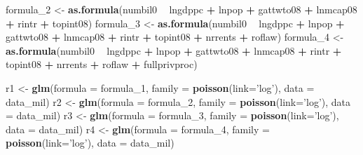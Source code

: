 \documentclass[]{book}
\newenvironment{Shaded}{\begin{snugshade}}{\end{snugshade}}
\newcommand{\KeywordTok}[1]{\textcolor[rgb]{0.13,0.29,0.53}{\textbf{#1}}}
\newcommand{\DataTypeTok}[1]{\textcolor[rgb]{0.13,0.29,0.53}{#1}}
\newcommand{\DecValTok}[1]{\textcolor[rgb]{0.00,0.00,0.81}{#1}}
\newcommand{\StringTok}[1]{\textcolor[rgb]{0.31,0.60,0.02}{#1}}
\newcommand{\OperatorTok}[1]{\textcolor[rgb]{0.81,0.36,0.00}{\textbf{#1}}}
\newcommand{\NormalTok}[1]{#1}
\begin{document}
\begin{Shaded}
\begin{Highlighting}[]
\NormalTok{formula_}\DecValTok{2}\NormalTok{ <-}\StringTok{ }\KeywordTok{as.formula}\NormalTok{(numbil0 }\OperatorTok{~}\StringTok{  }\NormalTok{lngdppc }\OperatorTok{+}\StringTok{ }\NormalTok{lnpop }\OperatorTok{+}\StringTok{  }\NormalTok{gattwto08 }\OperatorTok{+}\StringTok{  }\NormalTok{lnmcap08 }\OperatorTok{+}\StringTok{  }\NormalTok{rintr }\OperatorTok{+}\StringTok{  }\NormalTok{topint08)}
\NormalTok{formula_}\DecValTok{3}\NormalTok{ <-}\StringTok{ }\KeywordTok{as.formula}\NormalTok{(numbil0 }\OperatorTok{~}\StringTok{  }\NormalTok{lngdppc }\OperatorTok{+}\StringTok{ }\NormalTok{lnpop }\OperatorTok{+}\StringTok{  }\NormalTok{gattwto08 }\OperatorTok{+}\StringTok{  }\NormalTok{lnmcap08 }\OperatorTok{+}\StringTok{  }\NormalTok{rintr }\OperatorTok{+}\StringTok{  }\NormalTok{topint08 }\OperatorTok{+}\StringTok{  }\NormalTok{nrrents }\OperatorTok{+}\StringTok{  }\NormalTok{roflaw)}
\NormalTok{formula_}\DecValTok{4}\NormalTok{ <-}\StringTok{ }\KeywordTok{as.formula}\NormalTok{(numbil0 }\OperatorTok{~}\StringTok{  }\NormalTok{lngdppc }\OperatorTok{+}\StringTok{ }\NormalTok{lnpop }\OperatorTok{+}\StringTok{  }\NormalTok{gattwto08 }\OperatorTok{+}\StringTok{  }\NormalTok{lnmcap08 }\OperatorTok{+}\StringTok{  }\NormalTok{rintr }\OperatorTok{+}\StringTok{  }\NormalTok{topint08 }\OperatorTok{+}\StringTok{  }\NormalTok{nrrents }\OperatorTok{+}\StringTok{  }\NormalTok{roflaw }\OperatorTok{+}\StringTok{  }\NormalTok{fullprivproc)}

\NormalTok{r1 <-}\StringTok{ }\KeywordTok{glm}\NormalTok{(}\DataTypeTok{formula =}\NormalTok{ formula_}\DecValTok{1}\NormalTok{, }\DataTypeTok{family =} \KeywordTok{poisson}\NormalTok{(}\DataTypeTok{link=}\StringTok{'log'}\NormalTok{), }\DataTypeTok{data =}\NormalTok{ data_mil)}
\NormalTok{r2 <-}\StringTok{ }\KeywordTok{glm}\NormalTok{(}\DataTypeTok{formula =}\NormalTok{ formula_}\DecValTok{2}\NormalTok{, }\DataTypeTok{family =} \KeywordTok{poisson}\NormalTok{(}\DataTypeTok{link=}\StringTok{'log'}\NormalTok{), }\DataTypeTok{data =}\NormalTok{ data_mil)}
\NormalTok{r3 <-}\StringTok{ }\KeywordTok{glm}\NormalTok{(}\DataTypeTok{formula =}\NormalTok{ formula_}\DecValTok{3}\NormalTok{, }\DataTypeTok{family =} \KeywordTok{poisson}\NormalTok{(}\DataTypeTok{link=}\StringTok{'log'}\NormalTok{), }\DataTypeTok{data =}\NormalTok{ data_mil)}
\NormalTok{r4 <-}\StringTok{ }\KeywordTok{glm}\NormalTok{(}\DataTypeTok{formula =}\NormalTok{ formula_}\DecValTok{4}\NormalTok{, }\DataTypeTok{family =} \KeywordTok{poisson}\NormalTok{(}\DataTypeTok{link=}\StringTok{'log'}\NormalTok{), }\DataTypeTok{data =}\NormalTok{ data_mil)}


\end{Highlighting}
\end{Shaded}
\end{document}
